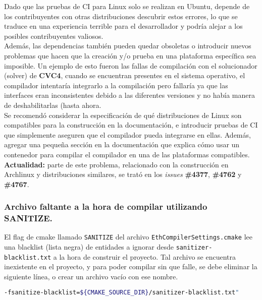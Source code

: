 Dado que las pruebas de CI para Linux solo se realizan en Ubuntu, depende de los contribuyentes con otras distribuciones descubrir estos errores, lo que se traduce en una experiencia terrible para el desarrollador y podría alejar a los posibles contribuyentes valiosos.\\

Además, las dependencias también pueden quedar obsoletas o introducir nuevos problemas que hacen que la creación y/o prueba en una plataforma específica sea imposible. Un ejemplo de esto fueron las fallas de compilación con el solucionador (solver) de \textbf{CVC4}, cuando se encuentran presentes en el sistema operativo, el compilador intentaría integrarlo a la compilación pero fallaría ya que las interfaces eran inconsistentes debido a las diferentes versiones y no había manera de deshabilitarlas (hasta ahora\cite{GHPR4767}.\\

Se recomendó considerar la especificación de qué distribuciones de Linux son compatibles para la construcción en la documentación, e introducir pruebas de CI que simplemente aseguren que el compilador pueda integrarse en ellas. Además, agregar una pequeña sección en la documentación que explica cómo usar un contenedor para compilar el compilador en una de las plataformas compatibles.\\

\textbf{Actualidad:} parte de este problema, relacionado con la construcción en Archlinux y distribuciones similares, se trató en los \textit{issues} \textbf{\#4377}\cite{GHI4377}, \textbf{\#4762}\cite{GHI4762} y \textbf{\#4767}\cite{GHI4767}.\\


\subsubsection{Archivo faltante a la hora de compilar utilizando SANITIZE.}

El flag de cmake llamado \verb|SANITIZE| del archivo \verb|EthCompilerSettings.cmake|\cite{SolidityEthCompilerSettings} lee una blacklist (lista negra) de entidades a ignorar desde \verb|sanitizer-blacklist.txt|  a la hora de construir el proyecto. Tal archivo se encuentra inexistente en el proyecto, y para poder compilar sin que falle, se debe eliminar la siguiente línea, o crear un archivo vacío con ese nombre.

\begin{lstlisting}[language=bash]
-fsanitize-blacklist=${CMAKE_SOURCE_DIR}/sanitizer-blacklist.txt"
\end{lstlisting}

